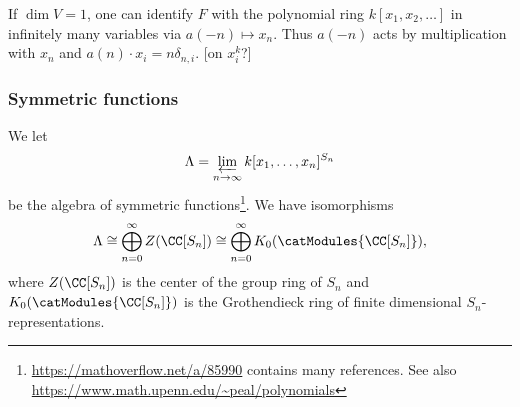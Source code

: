 \documentclass{ck-article}
\newcommand\SymGrp[1]{S_{#1}}
\begin{document}
\begin{Example}
    If $\dim V = 1$, one can identify $F$ with the polynomial ring $k[x_1,x_2,\dots]$ in infinitely many variables via $a(-n) \mapsto x_n$.
    Thus $a(-n)$ acts by multiplication with $x_n$ and $a(n) \cdot x_i = n\delta_{n,i}$. [on $x_i^k$?]
\end{Example}

\subsubsection{Symmetric functions}

We let
\[
    \Lambda = \varprojlim_{n \to \infty} k[x_1,\dotsc,x_n]^{\SymGrp n}
\]
be the algebra of symmetric functions\footnote{\url{https://mathoverflow.net/a/85990} contains many references. See also \url{https://www.math.upenn.edu/~peal/polynomials}}.
We have isomorphisms
\[
    \Lambda \cong 
    \bigoplus_{n=0}^\infty Z(\CC[\SymGrp n]) \cong
    \bigoplus_{n=0}^\infty K_0(\catModules{\CC[\SymGrp n]}),
\]
where $Z(\CC[\SymGrp n])$ is the center of the group ring of $\SymGrp n$ and $K_0(\catModules{\CC[\SymGrp n]})$ is the Grothendieck ring of finite dimensional $\SymGrp n$-representations.
\end{document}
